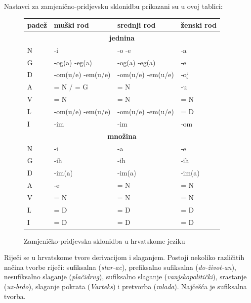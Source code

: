 \begin{multicols}{2}
Nastavci za zamjenično-pridjevsku sklonidbu prikazani su u ovoj tablici:

\begin{figure}[htb]
\centering
    \begin{tabular}{|l|l|l|l|}
        \hline
        \textbf{padež} & \textbf{muški rod}         & \textbf{srednji rod}        & \textbf{ženski rod} \\ \hline
		\multicolumn{4}{|c|}{\textbf{jednina}} \\ \hline
        N     & -i                & -o -e             & -a          \\ 
        G     & -og(a) -eg(a)     & -og(a) -eg(a)     & -e          \\ 
        D     & -om(u/e) -em(u/e) & -om(u/e) -em(u/e) & -oj         \\ 
        A     & = N / = G         & = N               & -u          \\ 
        V     & = N               & = N               & = N         \\ 
        L     & -om(u/e) -em(u/e) & -om(u/e) -em(u/e) & = D         \\ 
        I     & -im               & -im               & -om         \\ \hline
		\multicolumn{4}{|c|}{\textbf{množina}} \\ \hline
		N     & -i        & -a         & -e          \\ 
        G     & -ih       & -ih        & -ih         \\ 
        D     & -im(a)    & -im(a)     & -im(a)      \\ 
        A     & -e        & = N        & = N         \\ 
        V     & = N       & = N        & = N         \\ 
        L     & = D       & = D        & = D         \\ 
        I     & = D       & = D        & = D         \\
        \hline
   \end{tabular}
  \caption{Zamjeničko-pridjevska sklonidba u hrvatskome jeziku}
  \label{fig:zamjenicka}
\end{figure}

Riječi se u hrvatskome tvore derivacijom i slaganjem. Postoji nekoliko različitih načina tvorbe riječi: sufiksalna (\emph{star-ac}), prefiksalno sufiksalna (\emph{do-život-an}), nesufiksalno slaganje (\emph{plačidrug}), sufiksalno slaganje (\emph{vanjskopolitički}), srastanje (\emph{uz-brdo}), slaganje pokrata (\emph{Varteks}) i pretvorba (\emph{mlada}). Najčešća je sufiksalna tvorba.


\end{multicols}

